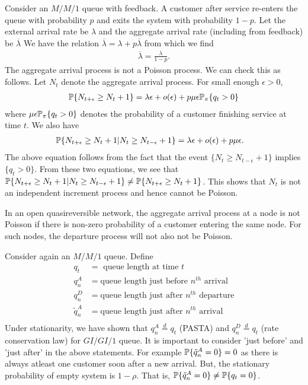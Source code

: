 \documentclass[all-lectures.tex]{subfiles}
\begin{document}
Consider an $M/M/1$ queue with feedback. A customer after service re-enters the queue with probability $p$ and exits the system with probability $1-p$. Let the external arrival rate be $\lambda$ and the aggregate arrival rate (including from feedback) be $\overline{\lambda}$ We have the relation $\overline{\lambda} = \lambda + p \overline{\lambda}$ from which we find
\begin{align*}
\overline{\lambda} = \frac{\lambda}{1-p}.
\end{align*}
The aggregate arrival process is not a Poisson process. We can check this as follows. Let $N_t$ denote the aggregate arrival process. For small enough $\epsilon >0$,
\begin{align*}
\P\{N_{t+\epsilon} \geq N_t + 1\} = \lambda \epsilon + o(\epsilon) + p \mu \epsilon \P_{\pi}\{q_t > 0\}
\end{align*}
where $\mu \epsilon \P_{\pi}\{q_t > 0\}$ denotes the probability of a customer finishing service at time $t$. We also have \begin{align*}
\P\{N_{t+\epsilon} \geq N_t + 1| N_{t} \geq N_{t-\epsilon} + 1\} &= \lambda \epsilon + o(\epsilon) + p \mu \epsilon.
\end{align*}
The above equation follows from the fact that the event $\{N_{t} \geq N_{t-\epsilon} + 1\}$ implies $\{q_t > 0\}$. From these two equations, we see that $\P\{N_{t+\epsilon} \geq N_t + 1| N_{t} \geq N_{t-\epsilon} + 1\} \neq \P\{N_{t+\epsilon} \geq N_t + 1\}$. This shows that $N_t$ is not an independent increment process and hence cannot be Poisson. 

In an open quasireversible network, the aggregate arrival process at a node is not Poisson if there is non-zero probability of a customer entering the same node. For such nodes, the departure process will not also not be Poisson. 

Consider again an $M/M/1$ queue. Define 
\begin{align*}
q_t &= \text{ queue length at time $t$} \\
q_n^A &= \text{queue length just before $n^{th}$ arrival} \\
q_n^D &= \text{queue length just after $n^{th}$ departure} \\
\tilde{q}_n^A &= \text{queue length just after $n^{th}$ arrival} \\
\end{align*}
Under stationarity, we have shown that $q^A_n \stackrel{d}{=} q_t$ (PASTA) and $q^D_n \stackrel{d}{=} q_t$ (rate conservation law) for $GI/GI/1$ queue. It is important to consider 'just before' and 'just after'  in the above statements. For example $\P\{\tilde{q}^A_n = 0\} =0$ as there is always atleast one customer soon after a new arrival. But, the stationary probability of empty system is $1-\rho$. That is, $\P\{\tilde{q}^A_n = 0\} \neq \P\{q_t = 0\}$.
\end{document}
